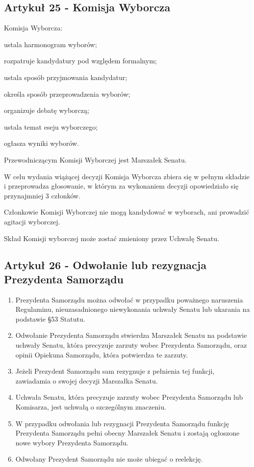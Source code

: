 \documentclass[14pt]{article}
\newcounter{podpunktyCounter}
\newenvironment{podpunkty}
{%
	\begin{list}{\arabic{podpunktyCounter})}%
		{%
			\usecounter{podpunktyCounter}
			\setlength{\itemsep}{1pt}
			\setlength{\topsep}{3pt}
		}%
	}%
	{\end{list}}
\newenvironment{ustepy}{%
	\begin{enumerate}[leftmargin=1.5em, itemindent=1pt, labelwidth=1em, itemsep=5pt]
	}{%
	\end{enumerate}
}
\begin{document}
\subsection*{Artykuł 25 - Komisja Wyborcza}
\begin{ustepy}
	\item Komisja Wyborcza:
	\begin{podpunkty}
		\item ustala harmonogram wyborów;
		\item rozpatruje kandydatury pod względem formalnym;
		\item ustala sposób przyjmowania kandydatur;
		\item określa sposób przeprowadzenia wyborów;
		\item organizuje debatę wyborczą;
		\item ustala temat eseju wyborczego;
		\item ogłasza wyniki wyborów.
	\end{podpunkty}
	\item Przewodniczącym Komisji Wyborczej jest Marszałek Senatu.
	\item W celu wydania wiążącej decyzji Komisja Wyborcza zbiera się w pełnym składzie i przeprowadza głosowanie, w którym za wykonaniem decyzji opowiedziało się przynajmniej 3 członków.
	\item Członkowie Komisji Wyborczej nie mogą kandydować w wyborach, ani prowadzić agitacji wyborczej.
	\item Skład Komisji wyborczej może zostać zmieniony przez Uchwałę Senatu.
	\end{ustepy}
\subsection*{Artykuł 26 - Odwołanie lub rezygnacja Prezydenta Samorządu}
\begin{ustepy}
	\item Prezydenta Samorządu można odwołać w przypadku poważnego naruszenia Regulaminu, nieuzasadnionego niewykonania uchwały Senatu lub ukarania na podstawie §53 Statutu.
	\item Odwołanie Prezydenta Samorządu stwierdza Marszałek Senatu na podstawie uchwały Senatu, która precyzuje zarzuty wobec Prezydenta Samorządu, oraz opinii Opiekuna Samorządu, która potwierdza te zarzuty.
	\item Jeżeli Prezydent Samorządu sam rezygnuje z pełnienia tej funkcji, zawiadamia o swojej decyzji Marszałka Senatu.
	\item Uchwała Senatu, która precyzuje zarzuty wobec Prezydenta Samorządu lub Komisarza, jest uchwałą o szczególnym znaczeniu.
	\item W przypadku odwołania lub rezygnacji Prezydenta Samorządu funkcję Prezydenta Samorządu pełni obecny Marszałek Senatu i zostają ogłoszone nowe wybory Prezydenta Samorządu.
	\item Odwołany Prezydent Samorządu nie może ubiegać o reelekcję.
\end{ustepy}
\end{document}
